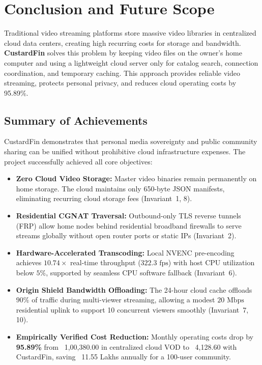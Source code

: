 
\chapter{Conclusion and Future Scope}
\label{chap:conclusion}

Traditional video streaming platforms store massive video libraries in centralized cloud data centers, creating high recurring costs for storage and bandwidth. \textbf{CustardFin} solves this problem by keeping video files on the owner's home computer and using a lightweight cloud server only for catalog search, connection coordination, and temporary caching. This approach provides reliable video streaming, protects personal privacy, and reduces cloud operating costs by 95.89\%.

\section{Summary of Achievements}
\label{sec:conclusion_achievements}

CustardFin demonstrates that personal media sovereignty and public community sharing can be unified without prohibitive cloud infrastructure expenses. The project successfully achieved all core objectives:

\begin{itemize}
    \item \textbf{Zero Cloud Video Storage:} Master video binaries remain permanently on home storage. The cloud maintains only 650-byte JSON manifests, eliminating recurring cloud storage fees (Invariant~1, 8).
    \item \textbf{Residential CGNAT Traversal:} Outbound-only TLS reverse tunnels (FRP) allow home nodes behind residential broadband firewalls to serve streams globally without open router ports or static IPs (Invariant~2).
    \item \textbf{Hardware-Accelerated Transcoding:} Local NVENC pre-encoding achieves $10.74\times$ real-time throughput ($322.3\text{ fps}$) with host CPU utilization below $5\%$, supported by seamless CPU software fallback (Invariant~6).
    \item \textbf{Origin Shield Bandwidth Offloading:} The 24-hour cloud cache offloads $90\%$ of traffic during multi-viewer streaming, allowing a modest $20\text{ Mbps}$ residential uplink to support 10 concurrent viewers smoothly (Invariant~7, 10).
    \item \textbf{Empirically Verified Cost Reduction:} Monthly operating costs drop by \textbf{95.89\%} from \rupee~1{,}00{,}380.00 in centralized cloud VOD to \rupee~4{,}128.60 with CustardFin, saving \rupee~11.55 Lakhs annually for a 100-user community.
\end{itemize}

